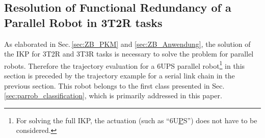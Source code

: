 \documentclass[robotics,article,submit,moreauthors,pdftex]{Definitions/mdpi}
\newcommand{\bm}[1]{\boldsymbol{#1}}
\newcommand{\transp}[0]{{\mathrm{T}}}
\begin{document}
\subsection{Resolution of Functional Redundancy of a Parallel Robot in 3T2R tasks}
\label{sec:Ergebnisse_IK_Parallel}


As elaborated in Sec.\,\ref{sec:ZB_PKM} and \ref{sec:ZB_Anwendung}, the solution of the IKP for 3T2R and 3T3R tasks is necessary to solve the problem for parallel robots.
Therefore\added[id=Sp]{,} the trajectory evaluation for a 6UPS parallel robot\footnote{For solving the full IKP, the actuation (such as ``6U\underline{P}S'') does not have to be considered.} in this section is preceded by the trajectory example for a serial link chain in the previous section.
This robot belongs to the first class presented in Sec.\,\ref{sec:parrob_classification}, which is primarily addressed in this paper.

\end{document}

